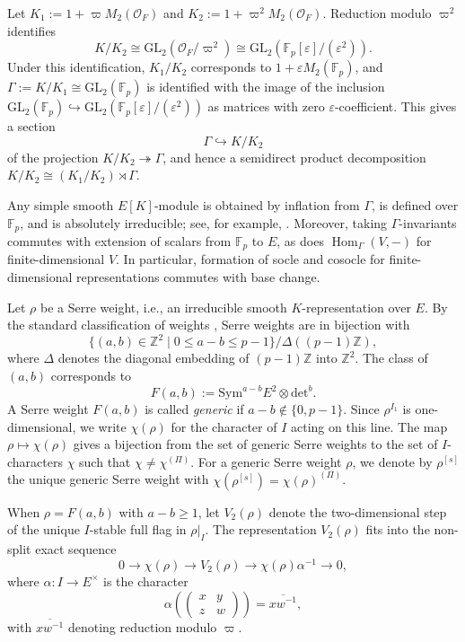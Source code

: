 \documentclass[a4paper,10pt,twoside]{amsart}
\DeclareMathOperator{\Hom}{Hom}
\newcommand{\Det}{\mathrm{det}}
\theoremstyle{definition}
\numberwithin{equation}{section}
\begin{document}
Let \(K_1:=1+\varpi M_2(\mathcal O_F)\) and
\(K_2:=1+\varpi^2M_2(\mathcal O_F)\). Reduction modulo \(\varpi^2\)
identifies
\[
K/K_2\cong
\mathrm{GL}_2(\mathcal O_F/\varpi^2)\cong
\mathrm{GL}_2(\mathbb F_p[\varepsilon]/(\varepsilon^2)).
\]
Under this identification, \(K_1/K_2\) corresponds to
\(1+\varepsilon M_2(\mathbb F_p)\), and
\(\Gamma:=K/K_1\cong\mathrm{GL}_2(\mathbb F_p)\) is identified with the image
of the inclusion \(\mathrm{GL}_2(\mathbb F_p)\hookrightarrow
\mathrm{GL}_2(\mathbb F_p[\varepsilon]/(\varepsilon^2))
\) as matrices with zero \(\varepsilon\)-coefficient. This gives a section
\begin{equation}\label{section}
\Gamma\hookrightarrow K/K_2
\end{equation}
of the projection \(K/K_2\twoheadrightarrow\Gamma\), and hence a semidirect
product decomposition \(K/K_2\cong (K_1/K_2)\rtimes\Gamma\).

Any simple smooth \(E[K]\)-module is obtained by inflation from \( \Gamma\), is defined over \(\mathbb{F}_p\), and is absolutely irreducible; see, for example, \cite[\S~1]{BL94}. Moreover, taking \(\Gamma\)-invariants commutes with extension of scalars from \(\mathbb{F}_p\) to \(E\), as does \(\Hom_{\Gamma}(V,-)\) for finite-dimensional $V$. In particular, formation of socle and cosocle for finite-dimensional representations commutes with base change.

Let \(\rho\) be a Serre weight, i.e., an irreducible smooth
\(K\)-representation over \(E\). By the standard classification of weights
\cite[Proposition~2.2]{Her11a}, Serre weights are in bijection with
\[
\{(a,b)\in\mathbb Z^2\mid 0\leq a-b\leq p-1\}
/\Delta((p-1)\mathbb Z),
\]
where \(\Delta\) denotes the diagonal embedding of \((p-1)\mathbb Z\) into
\(\mathbb Z^2\). The class of \((a,b)\) corresponds to
\[
F(a,b):=\mathrm{Sym}^{a-b}E^2\otimes\Det^b .
\]
A Serre weight \(F(a,b)\) is called \textit{generic} if
\(a-b\notin \{ 0,p-1\}\). Since \(\rho^{I_1}\) is
one-dimensional, we write \(\chi(\rho)\) for the character of \(I\) acting on
this line. The map \(\rho\mapsto\chi(\rho)\) gives a bijection from the set
of generic Serre weights to the set of \(I\)-characters \(\chi\) such that
\(\chi\neq\chi^{(\Pi)}\). For a generic Serre weight \(\rho\), we denote by
\(\rho^{[s]}\) the unique generic Serre weight with
\(\chi(\rho^{[s]})=\chi(\rho)^{(\Pi)}\).

When \(\rho=F(a,b)\) with \(a-b\geq 1\), let \(V_2(\rho)\) denote the
two-dimensional step of the unique \(I\)-stable full flag in \(\rho|_I\). The
representation \(V_2(\rho)\) fits into the non-split exact sequence
\begin{equation}\label{V2}
0\longrightarrow \chi(\rho)\longrightarrow V_2(\rho)
\longrightarrow \chi(\rho)\alpha^{-1}\longrightarrow 0,
\end{equation}
where \(\alpha:I\to E^\times\) is the character
\[
\alpha\!\left(\begin{pmatrix} x&y\\ z&w\end{pmatrix}\right)
=\overline{xw^{-1}},
\]
with \(\overline{xw^{-1}}\) denoting reduction modulo \(\varpi\).
\end{document}
